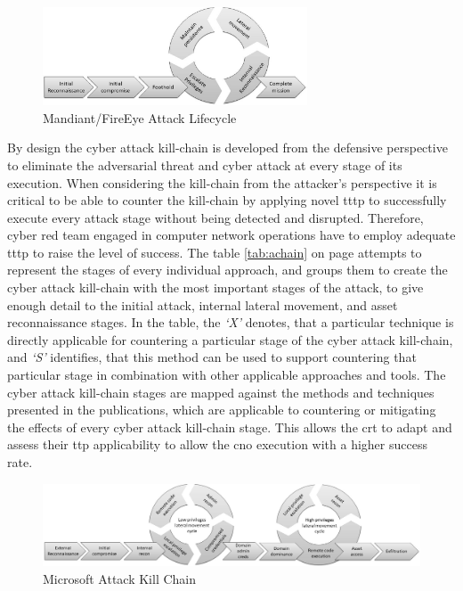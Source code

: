\begin{figure}[!htb]
    \centering
    \includegraphics[width=0.7\textwidth]{./img/attack-lifecycle.jpg}
    \caption{Mandiant/FireEye Attack Lifecycle \cite{FireEye2018}}
    \label{fig:alcycle}
\end{figure}

By design the cyber attack kill-chain is developed from the defensive perspective to eliminate the adversarial threat and cyber attack at every stage of its execution. When considering the kill-chain from the attacker's perspective it is critical to be able to counter the kill-chain by applying novel \gls{tttp} to successfully execute every attack stage without being detected and disrupted. Therefore, cyber red team engaged in computer network operations have to employ adequate \gls{tttp} to raise the level of success.
The table \ref{tab:achain} on page \pageref{tab:achain} attempts to represent the stages of every individual approach, and groups them to create the cyber attack kill-chain with the most important stages of the attack, to give enough detail to the initial attack, internal lateral movement, and asset reconnaissance stages. In the table, the \textit{`X'} denotes, that a particular technique is directly applicable for countering a particular stage of the cyber attack kill-chain, and \textit{`S'} identifies, that this method can be used to support countering that particular stage in combination with other applicable approaches and tools.
The cyber attack kill-chain stages are mapped against the methods and techniques presented in the publications, which are applicable to countering or mitigating the effects of every cyber  attack kill-chain stage. This allows the \gls{crt} to adapt and assess their \gls{ttp} applicability to allow the \gls{cno} execution with a higher success rate.

\begin{figure}[!htb]
    \centering
    \includegraphics[width=1.0\textwidth]{./img/attack-kill-chain.jpg}
    \caption{Microsoft Attack Kill Chain \cite{Microsoft2018}}
    \label{fig:akchain}
\end{figure}

